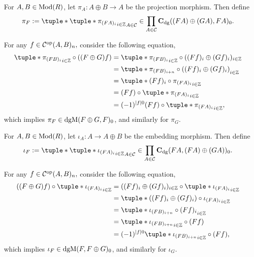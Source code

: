 \begin{remark}
    \label{rem:dgm_pi_iota}
    For \( A, B \in \operatorname{Mod}(R) \), let \( \pi_A: A \oplus B \to A \) be the projection morphism. Then define
    \[
        \pi_F := \tuple*{ \tuple*{ \pi_{(F A)_i} }_{i \in \Zb} }_{A \in \Cc} \in \prod_{A \in \Cc} \C_{\dg}((F A) \oplus (G A), F A)_0.
    \]

    For any \( f \in {\mathcal{C}}^{\operatorname{op}}(A, B)_n, \) consider the following equation,
    \begin{align*}
        \tuple*{ \pi_{(F B)_i} }_{i \in \Zb} \circ ((F \oplus G) f) &= \tuple*{ \pi_{(F B)_i} }_{i \in \Zb} \circ ((F f)_i \oplus (G f)_i)_{i \in \Zb} \\
        &= \tuple*{ \pi_{(F B)_{i + n}} \circ ((F f)_i \oplus (G f)_i) }_{i \in \Zb} \\
        &= \tuple*{ (F f)_i \circ \pi_{(F A)_i} }_{i \in \Zb} \\
        &= (F f) \circ \tuple*{ \pi_{(F A)_i} }_{i \in \Zb} \\
        &= (-1)^{|f| 0}(F f) \circ \tuple*{ \pi_{(F A)_i} }_{i \in \Zb}, \\
    \end{align*}
    which implies \( \pi_F \in \operatorname{dgM}(F \oplus G, F)_0 \), and similarly for \( \pi_G \).

    For \( A, B \in \operatorname{Mod}(R) \), let \( \iota_A: A \to A \oplus B \) be the embedding morphism. Then define
    \[
        \iota_F := \tuple*{ \tuple*{ \iota_{(F A)_i} }_{i \in \Zb} }_{A \in \Cc} \in \prod_{A \in \Cc} \C_{\dg}(F A, (F A) \oplus (G A) )_0.
    \]

    For any \( f \in {\mathcal{C}}^{\operatorname{op}}(A, B)_n, \) consider the following equation,
    \begin{align*}
        ((F \oplus G) f) \circ \tuple*{ \iota_{(F A)_i} }_{i \in \Zb} &= ((F f)_i \oplus (G f)_i)_{i \in \Zb} \circ \tuple*{ \iota_{(F A)_i} }_{i \in \Zb} \\
        &= \tuple*{ ((F f)_i \oplus (G f)_i) \circ \iota_{(F A)_i} }_{i \in \Zb} \\
        &= \tuple*{ \iota_{(F B)_{i + n}} \circ (F f)_i  }_{i \in \Zb} \\
        &= \tuple*{ \iota_{(F B)_{i + n}} }_{i \in \Zb} \circ (F f) \\
        &= (-1)^{|f| 0}\tuple*{ \iota_{(F B)_{i + n}} }_{i \in \Zb} \circ (F f), \\
    \end{align*}
    which implies \( \iota_F \in \operatorname{dgM}(F, F \oplus G)_0 \), and similarly for \( \iota_G \).


\end{remark}
